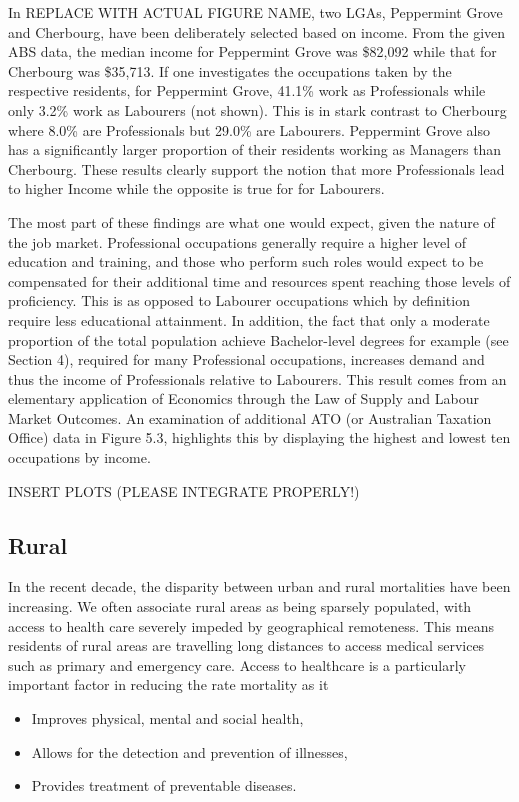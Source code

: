 \documentclass[12pt,a4paper]{article}
\begin{document}
	In REPLACE WITH ACTUAL FIGURE NAME, two LGAs, Peppermint Grove and Cherbourg, have been deliberately selected based on income. From the given ABS data, the median income for Peppermint Grove was \$82,092 while that for Cherbourg was \$35,713. If one investigates the occupations taken by the respective residents, for Peppermint Grove, 41.1\% work as Professionals while only 3.2\% work as Labourers (not shown). This is in stark contrast to Cherbourg where 8.0\% are Professionals but 29.0\% are Labourers. Peppermint Grove also has a significantly larger proportion of their residents working as Managers than Cherbourg. These results clearly support the notion that more Professionals lead to higher Income while the opposite is true for for Labourers.
	
	The most part of these findings are what one would expect, given the nature of the job market. Professional occupations generally require a higher level of education and training, and those who perform such roles would expect to be compensated for their additional time and resources spent reaching those levels of proficiency. This is as opposed to Labourer occupations which by definition require less educational attainment. In addition, the fact that only a moderate proportion of the total population achieve Bachelor-level degrees for example (see Section 4), required for many Professional occupations, increases demand and thus the income of Professionals relative to Labourers. This result comes from an elementary application of Economics through the Law of Supply and Labour Market Outcomes. An examination of additional ATO (or Australian Taxation Office) data in Figure 5.3, highlights this by displaying the highest and lowest ten occupations by income.
	
	INSERT PLOTS (PLEASE INTEGRATE PROPERLY!)
	\newpage
	\subsection{Rural }
	In the recent decade, the disparity between urban and rural mortalities have been increasing. We often associate rural areas as being sparsely populated, with access to health care severely impeded by geographical remoteness. This means residents of rural areas are travelling long distances to access medical services such as primary and emergency care. Access to healthcare is a particularly important factor in reducing the rate mortality as it
	\begin{itemize}
		\item Improves physical, mental and social health,
		\item Allows for the detection and prevention of illnesses,
		\item Provides treatment of preventable diseases.
	\end{itemize}
\end{document}
